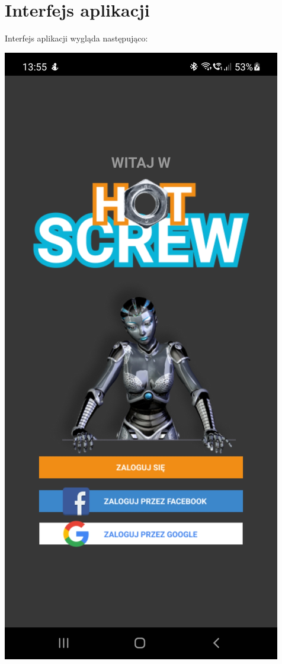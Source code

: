 \documentclass[12pt,a4paper]{article}
\begin{document}
	\section{Interfejs aplikacji}
	\indent Interfejs aplikacji wygląda następująco:
	\begin{center}
		\includegraphics[width=0.6\linewidth]{img/int1.jpg}

\end{center}
\end{document}
